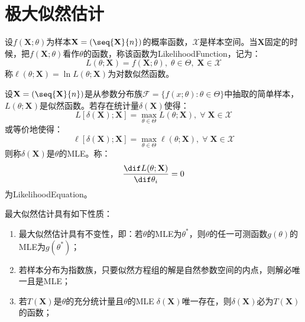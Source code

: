 \section{极大似然估计}

\begin{definition}
	设$f(\mathbf{X};\theta)$为样本$\mathbf{X}=(\seq{\mathbf{X}}{n})$的概率函数，$\mathcal{X}$是样本空间。当$\mathbf{X}$固定的时候，把$f(\mathbf{X};\theta)$看作$\theta$的函数，称该函数为\gls{LikelihoodFunction}，记为：
	\begin{equation*}
		L(\theta;\mathbf{X})=f(\mathbf{X};\theta),\;\theta\in\Theta,\;\mathbf{X}\in\mathcal{X}
	\end{equation*}
	称$\ell(\theta;\mathbf{X})=\ln L(\theta;\mathbf{X})$为对数似然函数。
\end{definition}
\begin{definition}
	设$\mathbf{X}=(\seq{\mathbf{X}}{n})$是从参数分布族$\mathcal{F}=\{f(x;\theta):\theta\in\Theta\}$中抽取的简单样本，$L(\theta;\mathbf{X})$是似然函数。若存在统计量$\delta(\mathbf{X})$使得：
	\begin{equation*}
		L[\delta(\mathbf{X});\mathbf{X}]=\max_{\theta\in\Theta}L(\theta;\mathbf{X}),\;\forall\;\mathbf{X}\in\mathcal{X}
	\end{equation*}
	或等价地使得：
	\begin{equation*}
		\ell[\delta(\mathbf{X});\mathbf{X}]=\max_{\theta\in\Theta}\ell(\theta;\mathbf{X}),\;\forall\;\mathbf{X}\in\mathcal{X}
	\end{equation*}
	则称$\delta(\mathbf{X})$是$\theta$的\gls{MLE}。称：
	\begin{equation*}
		\frac{\dif L(\theta;\mathbf{X})}{\dif\theta_i}=0
	\end{equation*}
	为\gls{LikelihoodEquation}。
\end{definition}
\begin{property}
	最大似然估计具有如下性质：
	\begin{enumerate}
		\item 最大似然估计具有不变性，即：若$\theta$的MLE为$\theta^*$，则$\theta$的任一可测函数$g(\theta)$的MLE为$g(\theta^*)$；
		\item 若样本分布为指数族，只要似然方程组的解是自然参数空间的内点，则解必唯一且是MLE；
		\item 若$T(\mathbf{X})$是$\theta$的充分统计量且$\theta$的MLE$\;\delta(\mathbf{X})$唯一存在，则$\delta(\mathbf{X})$必为$T(\mathbf{X})$的函数；
	\end{enumerate}
\end{property}